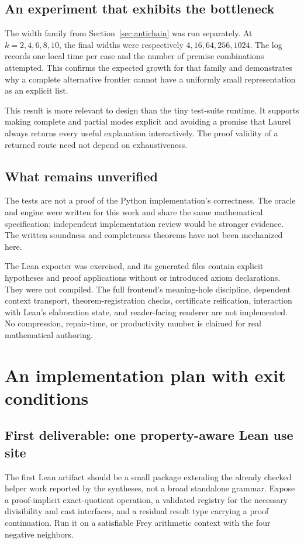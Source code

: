 \documentclass[11pt,a4paper]{article}
\newcommand{\code}[1]{\texttt{\detokenize{#1}}}
\theoremstyle{definition}
\theoremstyle{remark}
\begin{document}
\subsection{An experiment that exhibits the bottleneck}
The width family from Section~\ref{sec:antichain} was run separately. At $k=2,4,6,8,10$, the final widths were respectively $4,16,64,256,1024$. The log records one local time per case and the number of premise combinations attempted. This confirms the expected growth for that family and demonstrates why a complete alternative frontier cannot have a uniformly small representation as an explicit list.

This result is more relevant to design than the tiny test-suite runtime. It supports making complete and partial modes explicit and avoiding a promise that Laurel always returns every useful explanation interactively. The proof validity of a returned route need not depend on exhaustiveness.

\subsection{What remains unverified}
The tests are not a proof of the Python implementation's correctness. The oracle and engine were written for this work and share the same mathematical specification; independent implementation review would be stronger evidence. The written soundness and completeness theorems have not been mechanized here.

The Lean exporter was exercised, and its generated files contain explicit hypotheses and proof applications without \code{sorry} or introduced axiom declarations. They were not compiled. The full frontend's meaning-hole discipline, dependent context transport, theorem-registration checks, certificate reification, interaction with Lean's elaboration state, and reader-facing renderer are not implemented. No compression, repair-time, or productivity number is claimed for real mathematical authoring.

\section{An implementation plan with exit conditions}\label{sec:implementation}
\subsection{First deliverable: one property-aware Lean use site}
The first Lean artifact should be a small package extending the already checked helper work reported by the syntheses, not a broad standalone grammar. Expose a proof-implicit exact-quotient operation, a validated registry for the necessary divisibility and cast interfaces, and a residual result type carrying a proof continuation. Run it on a satisfiable Frey arithmetic context with the four negative neighbors.
\end{document}
